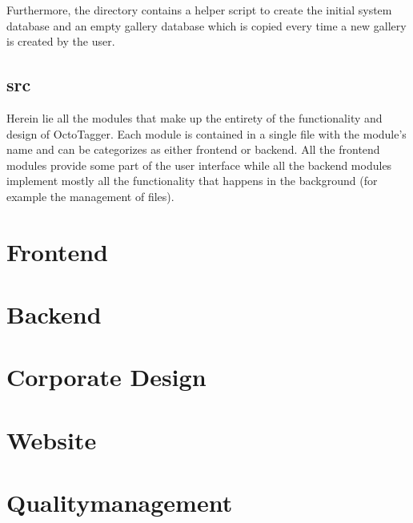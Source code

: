 Furthermore, the directory contains a helper script to create the initial
system database and an empty gallery database which is copied every time a new
gallery is created by the user.

\subsection{src}
Herein lie all the modules that make up the entirety of the functionality and
design of OctoTagger. Each module is contained in a single file with the
module's name and can be categorizes as either frontend or backend. All the
frontend modules provide some part of the user interface while all the backend
modules implement mostly all the functionality that happens in the background
(for example the management of files).


\section{Frontend}
%
\section{Backend}
%

\section{Corporate Design}
%
\section{Website}
%

\section{Qualitymanagement}
\def \kapitelautor {Julian Lorenz}
